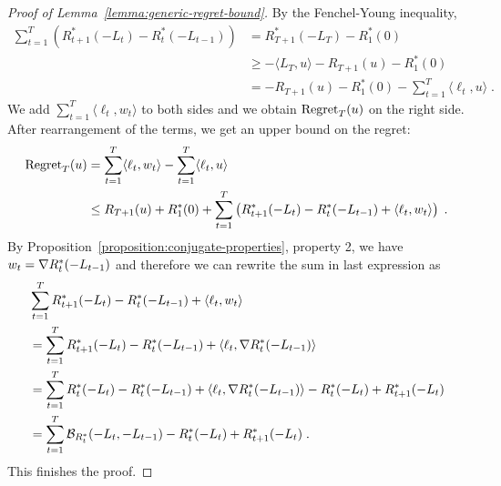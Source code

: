 \begin{proof}[Proof of Lemma~\ref{lemma:generic-regret-bound}]
By the Fenchel-Young inequality,
\begin{align*}
\sum_{t=1}^T \left( R_{t+1}^*(-L_t) - R_t^*(-L_{t-1}) \right)
& = R_{T+1}^*(-L_T) - R_1^*(0) \\
& \ge - \langle L_T, u \rangle - R_{T+1}(u)  - R_1^*(0) \\
& = - R_{T+1}(u)  - R_1^*(0) - \sum_{t=1}^T \langle \ell_t, u \rangle \; .
\end{align*}
We add $\sum_{t=1}^T \langle \ell_t, w_t \rangle$ to both sides and we obtain
$\operatorname{Regret}_T(u)$ on the right side. After rearrangement of the terms, we get an upper bound
on the regret:
\begin{align*}
\operatorname{Regret}_T(u)
& = \sum_{t=1}^T \langle \ell_t, w_t \rangle - \sum_{t=1}^T \langle \ell_t, u \rangle \\
& \le R_{T+1}(u) + R_1^*(0) + \sum_{t=1}^T \left( R_{t+1}^*(-L_t) - R_t^*(-L_{t-1}) + \langle \ell_t, w_t \rangle \right) \; .
\end{align*}
By Proposition~\ref{proposition:conjugate-properties}, property 2, we have $w_t =
\nabla R_t^*(-L_{t-1})$ and therefore we can rewrite the sum in last expression as
\begin{align*}
& \sum_{t=1}^T R_{t+1}^*(-L_t) - R_t^*(-L_{t-1}) + \langle \ell_t, w_t \rangle \\
& = \sum_{t=1}^T R_{t+1}^*(-L_t) - R_t^*(-L_{t-1}) + \langle \ell_t, \nabla R_t^*(-L_{t-1}) \rangle \\
& = \sum_{t=1}^T R_t^*(-L_t) - R_t^*(-L_{t-1}) + \langle \ell_t, \nabla R_t^*(-L_{t-1}) \rangle - R_t^*(-L_t) + R_{t+1}^*(-L_t) \\
& = \sum_{t=1}^T \mathcal{B}_{R_t^*}(-L_t, -L_{t-1}) - R_t^*(-L_t) + R_{t+1}^*(-L_t) \; .
\end{align*}
This finishes the proof.
\end{proof}
